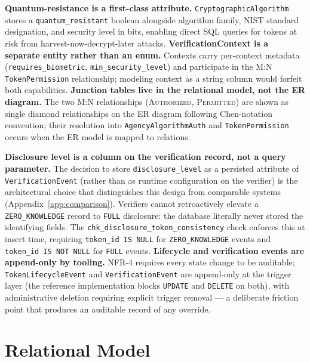 \documentclass[11pt,letterpaper]{article}
\newcommand{\entity}[1]{\texttt{\color{navydark}#1}}
\begin{document}
\textbf{Quantum-resistance is a first-class attribute.} \entity{CryptographicAlgorithm} stores a \texttt{quantum\_resistant} boolean alongside algorithm family, NIST standard designation, and security level in bits, enabling direct SQL queries for tokens at risk from harvest-now-decrypt-later attacks. \textbf{VerificationContext is a separate entity rather than an enum.} Contexts carry per-context metadata (\texttt{requires\_biometric}, \texttt{min\_security\_level}) and participate in the M:N \entity{TokenPermission} relationship; modeling context as a string column would forfeit both capabilities. \textbf{Junction tables live in the relational model, not the ER diagram.} The two M:N relationships (\textsc{Authorized}, \textsc{Permitted}) are shown as single diamond relationships on the ER diagram following Chen-notation convention; their resolution into \entity{AgencyAlgorithmAuth} and \entity{TokenPermission} occurs when the ER model is mapped to relations.

\textbf{Disclosure level is a column on the verification record, not a query parameter.} The decision to store \texttt{disclosure\_level} as a persisted attribute of \entity{VerificationEvent} (rather than as runtime configuration on the verifier) is the architectural choice that distinguishes this design from comparable systems (Appendix~\ref{app:comparison}). Verifiers cannot retroactively elevate a \texttt{ZERO\_KNOWLEDGE} record to \texttt{FULL} disclosure: the database literally never stored the identifying fields. The \texttt{chk\_disclosure\_token\_consistency} check enforces this at insert time, requiring \texttt{token\_id IS NULL} for \texttt{ZERO\_KNOWLEDGE} events and \texttt{token\_id IS NOT NULL} for \texttt{FULL} events. \textbf{Lifecycle and verification events are append-only by tooling.} NFR-4 requires every state change to be auditable; \entity{TokenLifecycleEvent} and \entity{VerificationEvent} are append-only at the trigger layer (the reference implementation blocks \texttt{UPDATE} and \texttt{DELETE} on both), with administrative deletion requiring explicit trigger removal --- a deliberate friction point that produces an auditable record of any override.


\section{Relational Model}
\label{sec:rel-model}
\end{document}
